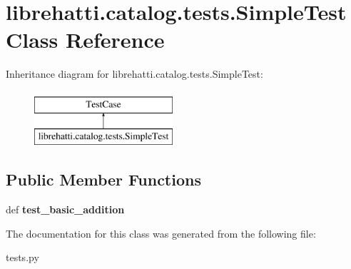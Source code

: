 \hypertarget{classlibrehatti_1_1catalog_1_1tests_1_1SimpleTest}{\section{librehatti.\-catalog.\-tests.\-Simple\-Test Class Reference}
\label{classlibrehatti_1_1catalog_1_1tests_1_1SimpleTest}
}
Inheritance diagram for librehatti.\-catalog.\-tests.\-Simple\-Test\-:\begin{figure}[H]
\begin{center}
\leavevmode
\includegraphics[height=2.000000cm]{classlibrehatti_1_1catalog_1_1tests_1_1SimpleTest}
\end{center}
\end{figure}
\subsection*{Public Member Functions}
\begin{DoxyCompactItemize}
\item 
\hypertarget{classlibrehatti_1_1catalog_1_1tests_1_1SimpleTest_a2850a4dc6ec1017ac441eb59f9d7d5ad}{def {\bfseries test\-\_\-basic\-\_\-addition}}\label{classlibrehatti_1_1catalog_1_1tests_1_1SimpleTest_a2850a4dc6ec1017ac441eb59f9d7d5ad}

\end{DoxyCompactItemize}


The documentation for this class was generated from the following file\-:\begin{DoxyCompactItemize}
\item 
tests.\-py\end{DoxyCompactItemize}
